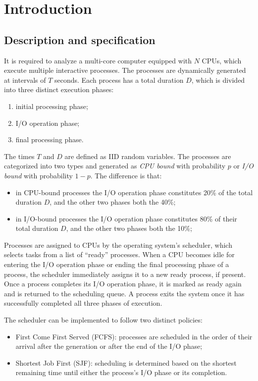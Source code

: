 \chapter{Introduction}

\section{Description and specification}
It is required to analyze a multi-core computer equipped with \( N \) CPUs, which execute multiple interactive processes. The processes are dynamically generated at intervals of \( T \) seconds. Each process has a total duration \( D \), which is divided into three distinct execution phases:
\begin{enumerate}
    \item initial processing phase;
    \item I/O operation phase;
    \item final processing phase.
\end{enumerate}

The times \( T \) and \( D \) are defined as IID random variables. The processes are categorized into two types and generated as \textit{CPU bound} with probability \( p \) or \textit{I/O bound} with probability \( 1 - p \). The difference is that:
\begin{itemize}
    \item in CPU-bound processes the I/O operation phase constitutes 20\% of the total duration \( D \), and the other two phases both the 40\%;
    \item in I/O-bound processes the I/O operation phase constitutes 80\% of their total duration \( D \), and the other two phases both the 10\%;
\end{itemize}

Processes are assigned to CPUs by the operating system’s scheduler, which selects tasks from a list of “ready” processes. When a CPU becomes idle for entering the I/O operation phase or ending the final processing phase of a process, the scheduler immediately assigns it to a new ready process, if present. Once a process completes its I/O operation phase, it is marked as ready again and is returned to the scheduling queue. A process exits the system once it has successfully completed all three phases of execution.

The scheduler can be implemented to follow two distinct policies:
\begin{itemize}
    \item First Come First Served (FCFS): processes are scheduled in the order of their arrival after the generation or after the end of the I/O phase;
    \item Shortest Job First (SJF): scheduling is determined based on the shortest remaining time until either the process’s I/O phase or its completion.
\end{itemize}

